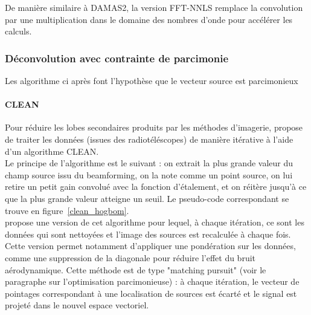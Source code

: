 De manière similaire à DAMAS2, la version FFT-NNLS remplace la convolution par une multiplication dans le domaine des nombres d'onde pour accélérer les calculs.

\subsubsection{Déconvolution avec contrainte de parcimonie}
Les algorithme ci après font l'hypothèse que le vecteur source est parcimonieux

\paragraph{CLEAN}
Pour réduire les lobes secondaires produits par les méthodes d'imagerie, \citep{Hogbom1974} propose de traiter les données (issues des radiotéléscopes) de manière itérative à l'aide d'un algorithme CLEAN.\\
Le principe de l'algorithme est le suivant : on extrait la plus grande valeur du champ source issu du beamforming, on la note comme un point source, on lui retire un petit gain convolué avec la fonction d'étalement, et on réitère jusqu'à ce que la plus grande valeur atteigne un seuil. Le pseudo-code correspondant se trouve en figure~\ref{clean_hogbom}.\\


\cite{Sijtsma2007} propose une version de cet algorithme pour lequel, à chaque itération, ce sont les données qui sont nettoyées et l'image des sources est recalculée à chaque fois. Cette version permet notamment d'appliquer une pondération sur les données, comme une suppression de la diagonale pour réduire l'effet du bruit aérodynamique. Cette méthode est de type "matching pursuit" (voir le paragraphe sur l'optimisation parcimonieuse) : à chaque itération, le vecteur de pointages correspondant à une localisation de sources est écarté et le signal est projeté dans le nouvel espace vectoriel.\\

